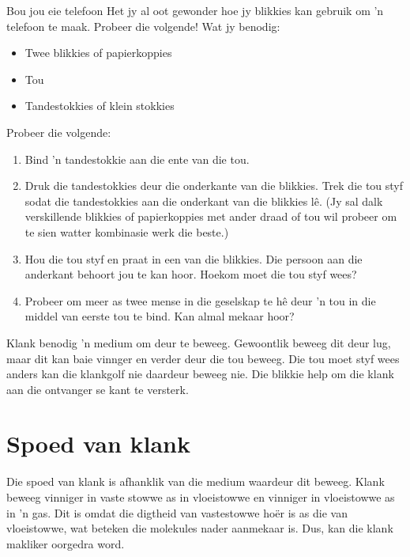 	\par


\begin{activity}{Bou jou eie telefoon} 
Het jy al oot gewonder hoe jy blikkies kan gebruik om 'n telefoon te maak. Probeer die volgende!
Wat jy benodig:
\begin{itemize}
 \item Twee blikkies of papierkoppies
  \item Tou
  \item Tandestokkies of klein stokkies
\end{itemize}

Probeer die volgende:
\begin{enumerate}[noitemsep, label=\textbf{\arabic*}. ] 
\item Bind 'n tandestokkie aan die ente van die tou. 
\item Druk die tandestokkies deur die onderkante van die blikkies. Trek die tou styf sodat die tandestokkies aan die onderkant van die blikkies l\^e. (Jy sal dalk verskillende blikkies of papierkoppies met ander draad of tou wil probeer om te sien watter kombinasie werk die beste.)
\item Hou die tou styf en praat in een van die blikkies. Die persoon aan die anderkant behoort jou te kan hoor. Hoekom moet die tou styf wees?
\item Probeer om meer as twee mense in die geselskap te h\^e deur 'n tou in die middel van eerste tou te bind. Kan almal mekaar hoor?
\end{enumerate}
Klank benodig 'n medium om deur te beweeg. Gewoontlik beweeg dit deur lug, maar dit kan baie vinnger en verder deur die tou beweeg. Die tou moet styf wees anders kan die klankgolf nie daardeur beweeg nie. Die blikkie help om die klank aan die ontvanger se kant te versterk.	
\end{activity}

    \label{m38799*cid3}
            \section{Spoed van klank}
            \nopagebreak
Die spoed van klank is afhanklik van die medium waardeur dit beweeg. Klank beweeg vinniger in vaste stowwe as in vloeistowwe en vinniger in vloeistowwe as in 'n gas. Dit is omdat die digtheid van vastestowwe ho\"{e}r is as die van vloeistowwe, wat beteken die molekules nader aanmekaar is. Dus, kan die klank makliker oorgedra word.\par 


